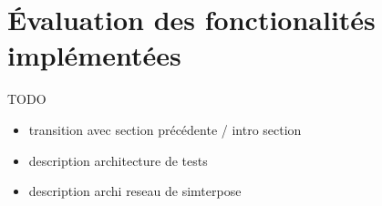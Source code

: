 \section{Évaluation des fonctionalités implémentées}
\label{section:evaluation}
{\color{red} TODO}

\begin{itemize}
\item transition avec section précédente / intro section
\item description architecture de tests
\item description archi reseau de simterpose
\end{itemize}
